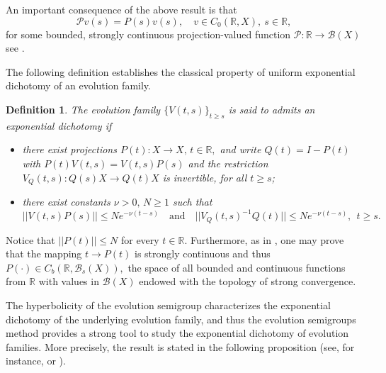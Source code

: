 \documentclass[10pt]{amsart}
\newtheorem{definition}{Definition}
\numberwithin{equation}{section}
\begin{document}
\medskip

An important consequence of the above result is that 
$$
\mathcal{P} v(s) = P(s) v(s), \quad v \in C_0(\mathbb{R},X), \ s \in \mathbb{R},
$$
for some bounded, strongly continuous projection-valued function $\mathcal{P}: \mathbb{R}  \to \mathcal{B}(X)$ see \cite[Proposition 9.13]{EN}.

\medskip

The following definition \cite[Def. 1.1]{LRS} establishes the classical property of uniform exponential dichotomy of an evolution family.

\begin{definition}\label{DicExp}
The evolution family  $\{V(t,s)\}_{t \ge s }$ is said to admits an exponential dichotomy if 
\begin{itemize}
    

\item[(a)] there exist projections $P(t): X \to X, \, t \in \mathbb{R},$ and write $Q(t) = I - P(t)$ with $P(t) V(t,s) = V(t,s) P(s)$ and the restriction $V_Q(t,s): Q(s)X \to Q(t)X$ is invertible, for all $t \ge s$;

\item[(b)] there exist constants $\nu > 0, \,  N\ge 1$ such that 
$$
||V(t,s)P(s)|| \le N e^{-\nu (t - s)} \quad \mbox{and} \quad ||V_Q(t,s)^{-1}Q(t)|| \le N e^{-\nu (t -s)}, \ \ t \ge s.
$$
\end{itemize}
\medskip

\end{definition}

Notice that $||P(t)|| \le N$ for every $t \in \mathbb{R}.$ Furthermore, as in \cite[Lemma 4.2]{VRS}, one may prove that the mapping $t \to P(t)$ is strongly continuous and thus $P(\cdot) \in C_b(\mathbb{R}, \mathcal{B}_s(X)),$ the space of all bounded and continuous functions from $\mathbb{R}$ with values in $\mathcal{B}(X)$ endowed with the topology of strong convergence.

\medskip
 The hyperbolicity of the evolution semigroup characterizes the exponential dichotomy of the underlying evolution family, and thus the evolution  semigroups method provides a strong tool to study the exponential dichotomy of evolution families. More precisely, the result is stated in the following proposition (see, for instance, \cite[Theorem 3.17, Theorem 4.25]{CL} or \cite[Theorem VI.9.18]{EN}).
\end{document}
